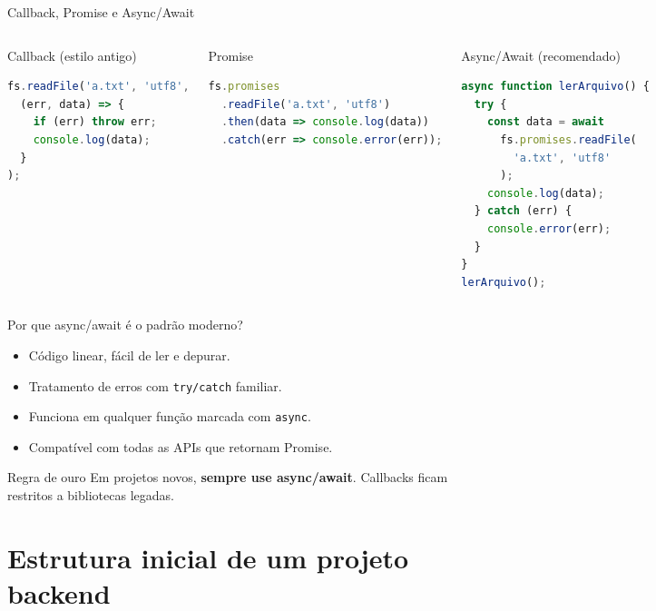 \documentclass[aspectratio=169]{beamer}
\newcommand{\code}[1]{\texttt{#1}}
\begin{document}
\begin{frame}[fragile]{Callback, Promise e Async/Await}
\begin{columns}[T]
\begin{block}{Callback (estilo antigo)}
\begin{lstlisting}[language=JavaScript]
fs.readFile('a.txt', 'utf8',
  (err, data) => {
    if (err) throw err;
    console.log(data);
  }
);
\end{lstlisting}
\end{block}
\begin{block}{Promise}
\begin{lstlisting}[language=JavaScript]
fs.promises
  .readFile('a.txt', 'utf8')
  .then(data => console.log(data))
  .catch(err => console.error(err));
\end{lstlisting}
\end{block}
\begin{block}{Async/Await (recomendado)}
\begin{lstlisting}[language=JavaScript]
async function lerArquivo() {
  try {
    const data = await
      fs.promises.readFile(
        'a.txt', 'utf8'
      );
    console.log(data);
  } catch (err) {
    console.error(err);
  }
}
lerArquivo();
\end{lstlisting}
\end{block}
\end{columns}
\end{frame}

\begin{frame}{Por que async/await \'{e} o padr\~ao moderno?}
\begin{itemize}
  \item C\'odigo linear, f\'acil de ler e depurar.
  \item Tratamento de erros com \code{try/catch} familiar.
  \item Funciona em qualquer fun\c{c}\~ao marcada com \code{async}.
  \item Compat\'ivel com todas as APIs que retornam Promise.
\end{itemize}
\begin{alertblock}{Regra de ouro}
Em projetos novos, \textbf{sempre use async/await}. Callbacks ficam restritos a bibliotecas legadas.
\end{alertblock}
\end{frame}

\section{Estrutura inicial de um projeto backend}
\end{document}

